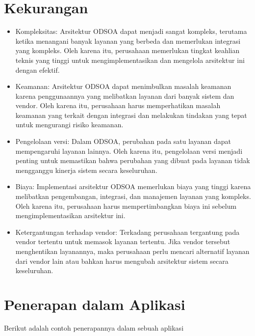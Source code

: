 \section{Kekurangan}
\begin{itemize}
\item Kompleksitas: Arsitektur ODSOA dapat menjadi sangat kompleks, terutama ketika menangani banyak layanan yang berbeda dan memerlukan integrasi yang kompleks. Oleh karena itu, perusahaan memerlukan tingkat keahlian teknis yang tinggi untuk mengimplementasikan dan mengelola arsitektur ini dengan efektif.
\item Keamanan: Arsitektur ODSOA dapat menimbulkan masalah keamanan karena penggunaannya yang melibatkan layanan dari banyak sistem dan vendor. Oleh karena itu, perusahaan harus memperhatikan masalah keamanan yang terkait dengan integrasi dan melakukan tindakan yang tepat untuk mengurangi risiko keamanan.
\item Pengelolaan versi: Dalam ODSOA, perubahan pada satu layanan dapat mempengaruhi layanan lainnya. Oleh karena itu, pengelolaan versi menjadi penting untuk memastikan bahwa perubahan yang dibuat pada layanan tidak mengganggu kinerja sistem secara keseluruhan.
\item Biaya: Implementasi arsitektur ODSOA memerlukan biaya yang tinggi karena melibatkan pengembangan, integrasi, dan manajemen layanan yang kompleks. Oleh karena itu, perusahaan harus mempertimbangkan biaya ini sebelum mengimplementasikan arsitektur ini.
\item Ketergantungan terhadap vendor: Terkadang perusahaan tergantung pada vendor tertentu untuk memasok layanan tertentu. Jika vendor tersebut menghentikan layanannya, maka perusahaan perlu mencari alternatif layanan dari vendor lain atau bahkan harus mengubah arsitektur sistem secara keseluruhan.
\end{itemize}

\section{Penerapan dalam Aplikasi}
Berikut adalah contoh penerapannya dalam sebuah aplikasi